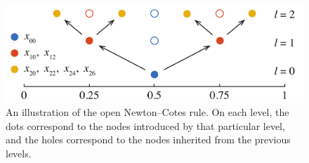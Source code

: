 \begin{figure}[t]
  \centering
  \includegraphics[width=1.0\columnwidth]{include/assets/figures/grid.pdf}
  \caption{
    An illustration of the open Newton--Cotes rule. On each level, the dots
    correspond to the nodes introduced by that particular level, and the holes
    correspond to the nodes inherited from the previous levels.
  }
\end{figure}
